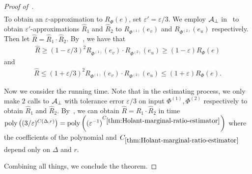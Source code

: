 \documentclass[11pt]{article}
\def\poly{\mathrm{poly}}
\newcommand{\wh}[1]{\widehat{#1}}
\renewcommand{\Pr}[2][]{ \ifthenelse{\isempty{#1}}
  {\mathbf{Pr}\left[#2\right]} {\mathbf{Pr}_{#1}\left[#2\right]} }
\begin{document}
\begin{proof}[Proof of~]
\begin{align*}
    \end{align*}
    To obtain an $\varepsilon$-approximation to $R_\Phi(e)$, set $\varepsilon' = \varepsilon/3$. We employ $\mathcal{A}_\bot$ in~ to obtain $\varepsilon'$-approximations $\wh{R}_1$ and $\wh{R}_2$ to $R_{\Phi^{(1)}}(e_v)$ and $R_{\Phi^{(2)}}(e_u)$ respectively. Then let $\wh{R} = \wh{R}_1 \cdot \wh{R}_2$. By~, we have that
    \begin{align*}
        \wh{R} \ge (1 - \varepsilon/3)^2 R_{\Phi^{(1)}}(e_v) \cdot R_{\Phi^{(2)}}(e_u) \ge (1 - \varepsilon) R_{\Phi}(e)
    \end{align*}
    and
    \begin{align*}
        \wh{R} \le (1 + \varepsilon/3)^2 R_{\Phi^{(1)}}(e_v) \cdot R_{\Phi^{(2)}}(e_u) \le (1 + \varepsilon) R_{\Phi}(e).
    \end{align*}

    Now we consider the running time. Note that in the estimating process, we only make $2$ calls to $\mathcal{A}_\bot$ with tolerance error $\varepsilon/3$ on input $\Phi^{(1)}, \Phi^{(2)}$ respectively to obtain $\wh{R}_1$ and $\wh{R}_2$. By~, we can obtain $\wh{R} = \wh{R}_1 \cdot \wh{R}_2$ in time $\poly\left((3/\varepsilon)^{C(\Delta, r)}\right) = \poly\left((\varepsilon^{-1})^{C_{\ref{thm:Holant-marginal-ratio-estimator}}}\right)$ where the coefficients of the polynomial and $C_{\ref{thm:Holant-marginal-ratio-estimator}}$ depend only on $\Delta$ and $r$.

    Combining all things, we conclude the theorem.


\end{proof}
\end{document}
